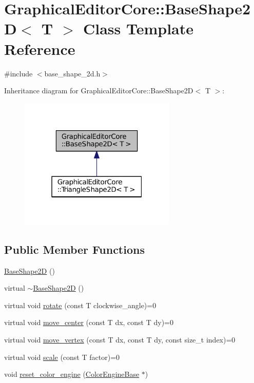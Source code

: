\hypertarget{classGraphicalEditorCore_1_1BaseShape2D}{}\section{Graphical\+Editor\+Core\+:\+:Base\+Shape2D$<$ T $>$ Class Template Reference}
\label{classGraphicalEditorCore_1_1BaseShape2D}


{\ttfamily \#include $<$base\+\_\+shape\+\_\+2d.\+h$>$}



Inheritance diagram for Graphical\+Editor\+Core\+:\+:Base\+Shape2D$<$ T $>$\+:
\nopagebreak
\begin{figure}[H]
\begin{center}
\leavevmode
\includegraphics[width=211pt]{classGraphicalEditorCore_1_1BaseShape2D__inherit__graph}
\end{center}
\end{figure}
\subsection*{Public Member Functions}
\begin{DoxyCompactItemize}
\item 
\hyperlink{classGraphicalEditorCore_1_1BaseShape2D_aa561989871a4590bad5377fa62f13443}{Base\+Shape2D} ()
\item 
virtual \hyperlink{classGraphicalEditorCore_1_1BaseShape2D_ada8fbba63ef307fe04688007aeec4f87}{$\sim$\+Base\+Shape2D} ()
\item 
virtual void \hyperlink{classGraphicalEditorCore_1_1BaseShape2D_a94a87b2fd8485cfb7d4ca97050d1bdde}{rotate} (const T clockwise\+\_\+angle)=0
\item 
virtual void \hyperlink{classGraphicalEditorCore_1_1BaseShape2D_aab368c5a675aff41dacb23bf4cce1acb}{move\+\_\+center} (const T dx, const T dy)=0
\item 
virtual void \hyperlink{classGraphicalEditorCore_1_1BaseShape2D_a22408ae787f6e0b5444c89399173af62}{move\+\_\+vertex} (const T dx, const T dy, const size\+\_\+t index)=0
\item 
virtual void \hyperlink{classGraphicalEditorCore_1_1BaseShape2D_a2ff960ec57b180222a084642fa7dc780}{scale} (const T factor)=0
\item 
void \hyperlink{classGraphicalEditorCore_1_1BaseShape2D_a8de5ea1a542510e0800a5e4293878e0b}{reset\+\_\+color\+\_\+engine} (\hyperlink{classGraphicalEditorCore_1_1ColorEngineBase}{Color\+Engine\+Base} $\ast$)
\end{DoxyCompactItemize}


